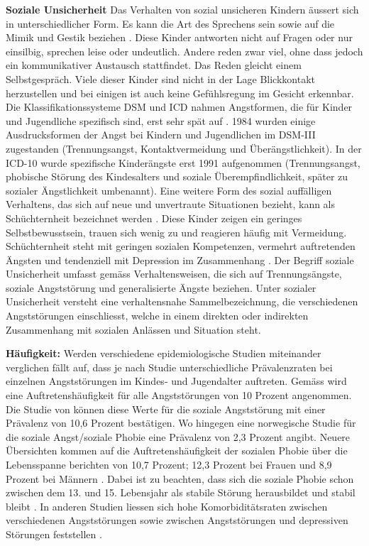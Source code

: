 \textbf{Soziale Unsicherheit}
Das Verhalten von sozial unsicheren Kindern äussert sich in unterschiedlicher Form. Es kann die Art des Sprechens sein sowie auf die Mimik und Gestik beziehen \cite{Petermann:2015}. Diese Kinder antworten nicht auf Fragen oder nur einsilbig, sprechen leise oder undeutlich. Andere reden zwar viel, ohne dass jedoch ein kommunikativer Austausch stattfindet. Das Reden gleicht einem Selbstgespräch. Viele dieser Kinder sind nicht in der Lage Blickkontakt herzustellen und bei einigen ist auch keine Gefühlsregung im Gesicht erkennbar. Die Klassifikationssysteme DSM und ICD nahmen Angstformen, die für Kinder und Jugendliche spezifisch sind, erst sehr spät auf \cite{Petermann:2015}. 1984 wurden einige Ausdrucksformen der Angst bei Kindern und Jugendlichen im DSM-III zugestanden (Trennungsangst, Kontaktvermeidung und Überängstlichkeit). In der ICD-10 wurde spezifische Kinderängste erst 1991 aufgenommen (Trennungsangst, phobische Störung des Kindesalters und soziale Überempfindlichkeit, später zu sozialer Ängstlichkeit umbenannt). Eine weitere Form des sozial auffälligen Verhaltens, das sich auf neue und unvertraute Situationen bezieht, kann als Schüchternheit bezeichnet werden \cite{Petermann:2015b}. Diese Kinder zeigen ein geringes Selbstbewusstsein, trauen sich wenig zu und reagieren häufig mit Vermeidung. Schüchternheit steht mit geringen sozialen Kompetenzen, vermehrt auftretenden Ängsten und tendenziell mit Depression im Zusammenhang \cite{Karevold:2012}. Der Begriff soziale Unsicherheit umfasst gemäss  Verhaltensweisen, die sich auf Trennungsängste, soziale Angststörung und generalisierte Ängste beziehen. Unter sozialer Unsicherheit versteht  eine verhaltensnahe Sammelbezeichnung, die verschiedenen Angststörungen einschliesst, welche in einem direkten oder indirekten Zusammenhang mit sozialen Anlässen und Situation steht. 

\textbf{Häufigkeit:} Werden verschiedene epidemiologische Studien miteinander verglichen fällt auf, dass je nach Studie unterschiedliche Prävalenzraten bei einzelnen Angststörungen im Kindes- und Jugendalter auftreten. Gemäss  wird eine Auftretenshäufigkeit für alle Angststörungen von 10 Prozent angenommen. Die Studie von  können diese Werte für die soziale Angststörung mit einer Prävalenz von 10,6 Prozent bestätigen. Wo hingegen eine norwegische Studie \cite{VanRoy:2009} für die soziale Angst/soziale Phobie eine Prävalenz von 2,3 Prozent angibt. Neuere Übersichten kommen auf die Auftretenshäufigkeit der sozialen Phobie über die Lebensspanne berichten von 10,7 Prozent; 12,3 Prozent bei Frauen und 8,9 Prozent bei Männern \cite{Kessler:2012}. Dabei ist zu beachten, dass sich die soziale Phobie schon zwischen dem 13. und 15. Lebensjahr als stabile Störung herausbildet und stabil bleibt \cite{Petermann:2015}. 
In anderen Studien liessen sich hohe Komorbiditätsraten zwischen verschiedenen Angststörungen \cite{HelbigLang:2009} sowie zwischen Angststörungen und depressiven Störungen feststellen \cite{Beesdo:2007}. 

